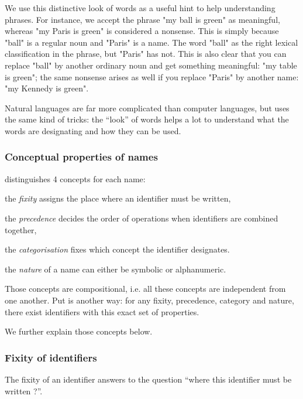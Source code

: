 We use this distinctive look of words as a useful hint to help understanding
phrases. For instance, we accept the phrase "my ball is green" as meaningful,
whereas "my Paris is green" is considered a nonsense. This is simply because
"ball" is a regular noun and "Paris" is a name. The word "ball" as the right
lexical classification in the phrase, but "Paris" has not. This is also clear
that you can replace "ball" by another ordinary noun and get something
meaningful: "my table is green"; the same nonsense arises as well if you
replace "Paris" by another name: "my Kennedy is green".

Natural languages are far more complicated than computer languages, but
{\focal} uses the same kind of tricks: the ``look'' of words helps a lot to
understand what the words are designating and how they can be used.

\subsubsection{Conceptual properties of names}

{\focal} distinguishes 4 concepts for each name:

\begin{citemize}
\item the {\em fixity} assigns the place where an identifier must be written,
\item the {\em precedence} decides the order of operations when
  identifiers are combined together,
\item the {\em categorisation} fixes which concept the identifier designates.
\item the {\em nature} of a name can either be symbolic or alphanumeric.
\end{citemize}

Those concepts are compositional, i.e. all these concepts are independent
from one another. Put is another way: for any fixity, precedence, category
and nature, there exist identifiers with this exact set of properties.

We further explain those concepts below.

\subsubsection{Fixity of identifiers}

The fixity of an identifier answers to the question ``where this identifier
must be written ?''.

